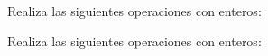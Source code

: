 \documentclass[addpoints,spanish, 12pt,a4paper]{exam}
\begin{document}
\begin{questions}




    

\question[2] Realiza las siguientes operaciones con enteros:
\begin{multicols}{2}
\end{multicols}


\question[2] Realiza las siguientes operaciones con enteros:
\begin{multicols}{2}
\begin{parts}

\end{parts}
\end{multicols}
\end{questions}
\end{document}
